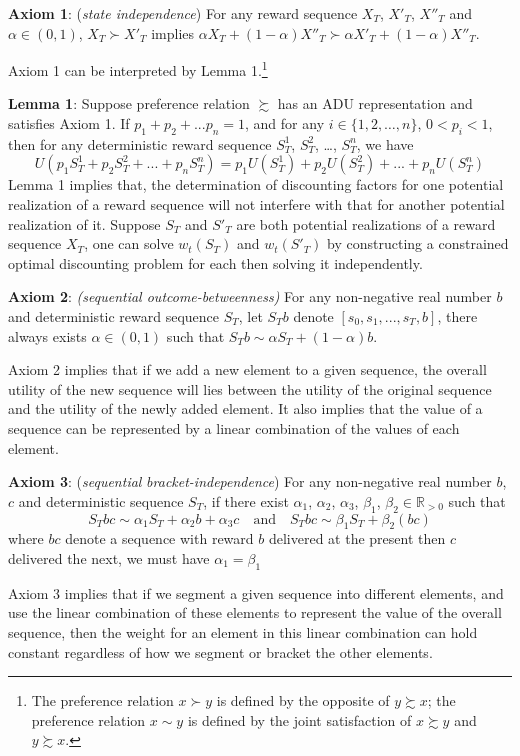 \documentclass[
  12pt,
]{article}
\begin{document}
\textbf{Axiom 1}: (\emph{state independence}) For any reward sequence
\(X_T\), \(X'_T\), \(X''_T\) and \(\alpha\in(0,1)\), \(X_T\succ X'_T\)
implies
\(\alpha X_T+ (1-\alpha)X''_T \succ \alpha X'_T + (1-\alpha) X''_T\).

Axiom 1 can be interpreted by Lemma 1.\footnote{The preference relation
  \(x \succ y\) is defined by the opposite of \(y\succsim x\); the
  preference relation \(x\sim y\) is defined by the joint satisfaction
  of \(x\succsim y\) and \(y \succsim x\).}

\textbf{Lemma 1}: Suppose preference relation \(\succsim\) has an ADU
representation and satisfies Axiom 1. If \(p_1+p_2+...p_n=1\), and for
any \(i\in\{1,2,…,n\}\), \(0<p_i<1\), then for any deterministic reward
sequence \(S^1_T\), \(S^2_T\), \ldots, \(S^n_T\), we
have\[ U(p_1 S^1_T+p_2S^2_T+...+p_nS^n_T)=p_1U(S^1_T)+p_2U(S^2_T)+...+p_nU(S^n_T) \]Lemma
1 implies that, the determination of discounting factors for one
potential realization of a reward sequence will not interfere with that
for another potential realization of it. Suppose \(S_T\) and \(S'_{T}\)
are both potential realizations of a reward sequence \(X_T\), one can
solve \(w_t(S_T)\) and \(w_t(S'_T)\) by constructing a constrained
optimal discounting problem for each then solving it independently.

\textbf{Axiom 2}: \emph{(sequential outcome-betweenness)} For any
non-negative real number \(b\) and deterministic reward sequence
\(S_T\), let \(S_Tb\) denote \([s_0,s_1,...,s_T,b]\), there always
exists \(\alpha\in(0,1)\) such that \(S_Tb\sim \alpha S_T+(1-\alpha)b\).

Axiom 2 implies that if we add a new element to a given sequence, the
overall utility of the new sequence will lies between the utility of the
original sequence and the utility of the newly added element. It also
implies that the value of a sequence can be represented by a linear
combination of the values of each element.

\textbf{Axiom 3}: (\emph{sequential} \emph{bracket-independence}) For
any non-negative real number \(b\), \(c\) and deterministic sequence
\(S_T\), if there exist \(\alpha_1\), \(\alpha_2\), \(\alpha_3\),
\(\beta_1\), \(\beta_2\in \mathbb{R}_{>0}\) such that
\[ S_Tbc\sim \alpha_1S_T+\alpha_2b+\alpha_3c \quad\text{and}\quad  S_Tbc\sim \beta_1S_T+\beta_2(bc) \]where
\(bc\) denote a sequence with reward \(b\) delivered at the present then
\(c\) delivered the next, we must have \(\alpha_1=\beta_1\)

Axiom 3 implies that if we segment a given sequence into different
elements, and use the linear combination of these elements to represent
the value of the overall sequence, then the weight for an element in
this linear combination can hold constant regardless of how we segment
or bracket the other elements.
\end{document}
